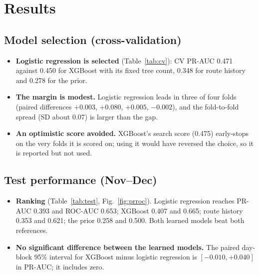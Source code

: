 \documentclass[conference]{IEEEtran}
\newcommand{\tabsize}{\footnotesize}
\begin{document}
\section{Results}\label{sec:results}
\subsection{Model selection (cross-validation)}
\begin{itemize}
\item \textbf{Logistic regression is selected} (Table~\ref{tab:cv}): CV PR-AUC 0.471 against 0.450 for XGBoost with its fixed tree count, 0.348 for route history and 0.278 for the prior.
\item \textbf{The margin is modest.} Logistic regression leads in three of four folds (paired differences $+0.003$, $+0.080$, $+0.005$, $-0.002$), and the fold-to-fold spread (SD about 0.07) is larger than the gap.
\item \textbf{An optimistic score avoided.} XGBoost's search score (0.475) early-stops on the very folds it is scored on; using it would have reversed the choice, so it is reported but not used.
\end{itemize}

\begin{table}[!t]
\caption{Rolling-CV PR-AUC on the validation months May--Aug.}
\label{tab:cv}
\centering\tabsize\setlength{\tabcolsep}{3.5pt}

\end{table}

\subsection{Test performance (Nov--Dec)}
\begin{itemize}
\item \textbf{Ranking} (Table~\ref{tab:test}, Fig.~\ref{fig:prroc}). Logistic regression reaches PR-AUC 0.393 and ROC-AUC 0.653; XGBoost 0.407 and 0.665; route history 0.353 and 0.621; the prior 0.258 and 0.500. Both learned models beat both references.
\item \textbf{No significant difference between the learned models.} The paired day-block 95\% interval for XGBoost minus logistic regression is $[-0.010,+0.040]$ in PR-AUC; it includes zero.
\end{itemize}

\begin{table}[!t]
\caption{Test metrics (Nov--Dec 2013). ECE Nov/Dec: per test month. Thr., Prec., Rec.: threshold frozen on Sep--Oct for precision $\ge0.40$, and its test precision and recall.}
\label{tab:test}
\centering\tabsize

\end{table}
\end{document}
